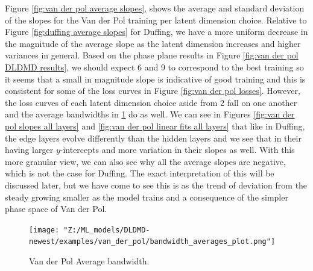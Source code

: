 Figure \ref{fig:van der pol average slopes}, shows the average and standard deviation of the slopes for 
the Van der Pol training per latent dimension choice. Relative to Figure \ref{fig:duffing average slopes}
for Duffing, we have a more uniform decrease in the magnitude of the average slope as the latent dimension 
increases and higher variances in general. Based on the phase plane results in Figure \ref{fig:van der pol DLDMD results}, 
we should expect 6 and 9 to correspond to the best training so it seems that a small in magnitude slope is indicative 
of good training and this is consistent for some of the loss curves in Figure \ref{fig:van der pol losses}. 
However, the loss curves of each latent dimension choice aside from 2 fall on one another and the average
bandwidths in \ref{fig:van der pol average bandwidth} do as well. We can see in Figures \ref{fig:van der pol slopes all layers}
and \ref{fig:van der pol linear fits all layers} that like in Duffing, the edge layers evolve differently 
than the hidden layers and we see that in their having larger $y$-intercepts and more variation in their 
slopes as well. With this more granular view, we can also see why all the average slopes are negative,
which is not the case for Duffing. The exact interpretation of this will be discussed later, but we have come 
to see this is as the trend of deviation from the steady growing smaller as the model trains and a consequence 
of the simpler phase space of Van der Pol.


\begin{figure}[ht]
    \centering
    \begin{minipage}{\textwidth}
        \texttt{[image: "Z:/ML\_models/DLDMD-newest/examples/van\_der\_pol/bandwidth\_averages\_plot.png"]} 
    \end{minipage} 
    \caption{Van der Pol Average bandwidth.}
    \label{fig:van der pol average bandwidth}
\end{figure}

